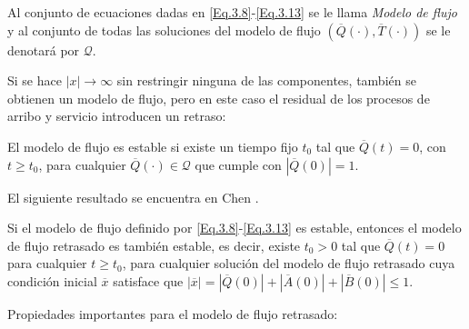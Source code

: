 Al conjunto de ecuaciones dadas en \ref{Eq.3.8}-\ref{Eq.3.13} se
le llama {\em Modelo de flujo} y al conjunto de todas las
soluciones del modelo de flujo
$\left(\overline{Q}\left(\cdot\right),\overline{T}
\left(\cdot\right)\right)$ se le denotar\'a por $\mathcal{Q}$.

Si se hace $|x|\rightarrow\infty$ sin restringir ninguna de las
componentes, tambi\'en se obtienen un modelo de flujo, pero en
este caso el residual de los procesos de arribo y servicio
introducen un retraso:

\begin{Def}
El modelo de flujo es estable si existe un tiempo fijo $t_{0}$ tal
que $\overline{Q}\left(t\right)=0$, con $t\geq t_{0}$, para
cualquier $\overline{Q}\left(\cdot\right)\in\mathcal{Q}$ que
cumple con $|\overline{Q}\left(0\right)|=1$.
\end{Def}

El siguiente resultado se encuentra en Chen \cite{Chen}.
\begin{Lemma}
Si el modelo de flujo definido por \ref{Eq.3.8}-\ref{Eq.3.13} es
estable, entonces el modelo de flujo retrasado es tambi\'en
estable, es decir, existe $t_{0}>0$ tal que
$\overline{Q}\left(t\right)=0$ para cualquier $t\geq t_{0}$, para
cualquier soluci\'on del modelo de flujo retrasado cuya
condici\'on inicial $\overline{x}$ satisface que
$|\overline{x}|=|\overline{Q}\left(0\right)|+|\overline{A}\left(0\right)|+|\overline{B}\left(0\right)|\leq1$.
\end{Lemma}


Propiedades importantes para el modelo de flujo retrasado:


